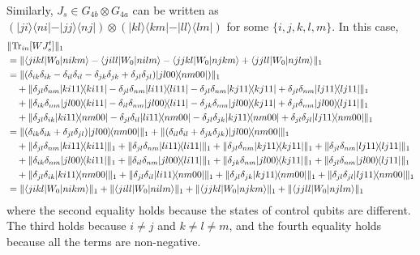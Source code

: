 \documentclass[a4paper,twocolumn,accepted=2022-10-23]{quantumarticle}
\newcommand{\bra}[1]{\langle {#1} \vert}
\newcommand{\ket}[1]{\vert {#1} \rangle}
\newcommand{\ketbra}[2]{\vert {#1} \rangle\!\langle {#2} \vert}
\newcommand{\Tr}[0]{{\mathrm{Tr}}}
\theoremstyle{definition}
\begin{document}
Similarly, $J_s \in G_{4b} \otimes G_{4a}$ can be written as
$(\ketbra{ji}{ni} - \ketbra{jj}{nj}) \otimes (\ketbra{kl}{km} - \ketbra{ll}{lm} )$ for some $\{i,j,k,l,m\}$.
In this case,
\begin{align}
&\| \Tr_{in} [W J_s^t] \|_1 \notag \\
&= \| \bra{jikl} {W_0} \ket{nikm} - \bra{jill} {W_0} \ket{nilm} - \bra{jjkl} {W_0} \ket{njkm} + \bra{jjll} {W_0} \ket{njlm} \|_1 \\
%
&= \| (\delta_{ik}\delta_{ik} - \delta_{il}\delta_{il} -\delta_{jk}\delta_{jk}  + \delta_{jl}\delta_{jl}) \ketbra{jl00}{nm00}) \|_1 \notag\\
&\quad + \| \delta_{jl}\delta_{nm} \ketbra{ki11}{ki11} - \delta_{jl}\delta_{nm} \ketbra{li11}{li11}
-\delta_{jl}\delta_{nm} \ketbra{kj11}{kj11} + \delta_{jl}\delta_{nm} \ketbra{lj11}{lj11} \|_1 \notag\\
&\quad + \| \delta_{ik}\delta_{nm} \ketbra{jl00}{ki11} - \delta_{il}\delta_{nm} \ketbra{jl00}{li11}
-\delta_{jk}\delta_{nm} \ketbra{jl00}{kj11} + \delta_{jl}\delta_{nm} \ketbra{jl00}{lj11} \|_1 \notag\\
&\quad + \| \delta_{jl}\delta_{ik} \ketbra{ki11}{nm00} - \delta_{jl}\delta_{il} \ketbra{li11}{nm00}
-\delta_{jl}\delta_{jk} \ketbra{kj11}{nm00} + \delta_{jl}\delta_{jl} \ketbra{lj11}{nm00} \|_1 \\
%
&= \| (\delta_{ik}\delta_{ik} + \delta_{jl}\delta_{jl}) \ketbra{jl00}{nm00} \|_1 + \| (\delta_{il}\delta_{il} + \delta_{jk}\delta_{jk}) \ketbra{jl00}{nm00} \|_1\notag\\
&\quad + \| \delta_{jl}\delta_{nm} \ketbra{ki11}{ki11} \|_1 + \| \delta_{jl}\delta_{nm} \ketbra{li11}{li11} \|_1
+ \| \delta_{jl}\delta_{nm} \ketbra{kj11}{kj11} \|_1 + \| \delta_{jl}\delta_{nm} \ketbra{lj11}{lj11} \|_1 \notag\\
&\quad + \| \delta_{ik}\delta_{nm} \ketbra{jl00}{ki11} \|_1 + \| \delta_{il}\delta_{nm} \ketbra{jl00}{li11} \|_1
+ \| \delta_{jk}\delta_{nm} \ketbra{jl00}{kj11} \|_1 + \| \delta_{jl}\delta_{nm} \ketbra{jl00}{lj11} \|_1 \notag\\
&\quad + \| \delta_{jl}\delta_{ik} \ketbra{ki11}{nm00} \|_1 + \| \delta_{jl}\delta_{il} \ketbra{li11}{nm00} \|_1
+ \| \delta_{jl}\delta_{jk} \ketbra{kj11}{nm00} \|_1 + \| \delta_{jl}\delta_{jl} \ketbra{lj11}{nm00} \|_1 \\
%
&= \| \bra{jikl} {W_0} \ket{nikm} \|_1 + \| \bra{jill} {W_0} \ket{nilm} \|_1 + \| \bra{jjkl} {W_0} \ket{njkm} \|_1 + \| \bra{jjll} {W_0} \ket{njlm} \|_1
\end{align}
where the second equality holds because the states of control qubits are different.
The third holds because $i \neq j$ and $k \neq l \neq m$,
and the fourth equality holds because all the terms are non-negative.
\end{document}
